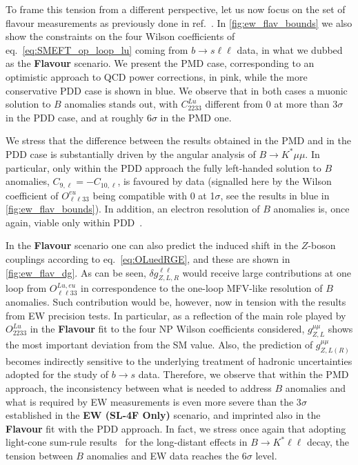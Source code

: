 To frame this tension from a different perspective, let us now focus on the set of flavour measurements as previously done in ref.~\cite{Ciuchini:2019usw}. In \autoref{fig:ew_flav_bounds} we also show the constraints on the four Wilson coefficients of eq.~\eqref{eq:SMEFT_op_loop_lu} coming from $b \to s\ell\ell$ data, in what we dubbed as the {\bf Flavour} scenario. We present the PMD case, corresponding to an optimistic approach to QCD power corrections, in pink, while the more conservative PDD case is shown in blue. We observe that in both cases a muonic solution to $B$ anomalies stands out, with $C^{Lu}_{2233}$ different from 0 at more than 3$\sigma$ in the PDD case, and at roughly 6$\sigma$ in the PMD one.

We stress that the difference between the results obtained in the PMD and in the PDD case is substantially driven by the angular analysis of $B \to K^{*} \mu \mu$. In particular, only within the PDD approach the fully left-handed solution to $B$ anomalies, $C_{9, \ell} = - C_{10, \ell}$, is favoured by data (signalled here by the Wilson coefficient of $O^{eu}_{\ell \ell 3 3}$ being compatible with 0 at 1$\sigma$, see the results in blue in \autoref{fig:ew_flav_bounds}). In addition, an electron resolution of $B$ anomalies is, once again, viable only within PDD~\cite{Ciuchini:2017mik,Ciuchini:2019usw}.

In the {\bf Flavour} scenario one can also predict the induced shift in the $Z$-boson couplings according to eq.~\eqref{eq:OLuedRGE}, and these are shown in \autoref{fig:ew_flav_dg}. As can be seen, $\delta g^{\ell \ell}_{Z,L,R}$ would receive large contributions at one loop from $O^{Lu,eu}_{\ell \ell 33}$ in correspondence to the one-loop MFV-like resolution of $B$ anomalies. Such contribution would be, however, now in tension with the results from EW precision tests. In particular, as a reflection of the main role played by $O^{Lu}_{2233}$ in the {\bf Flavour} fit to the four NP Wilson coefficients considered, $g^{\mu \mu}_{Z,L}$ shows the most important deviation from the SM value. Also, the prediction of $g^{ \mu \mu}_{Z,L(R)}$ becomes indirectly sensitive to the underlying treatment of hadronic uncertainties adopted for the study of $b \to s $ data. Therefore, we observe that within the PMD approach, the inconsistency between what is needed to address $B$ anomalies and what is required by EW measurements is even more severe than the 3$\sigma$ established in the {\bf EW (SL-4F Only)} scenario, and imprinted also in the {\bf Flavour} fit with the PDD approach. In fact, we stress once again that adopting light-cone sum-rule results~\cite{Khodjamirian:2010vf} for the long-distant effects in $B \to K^{*} \ell \ell$ decay, the tension between $B$ anomalies and EW data reaches the 6$\sigma$ level.

